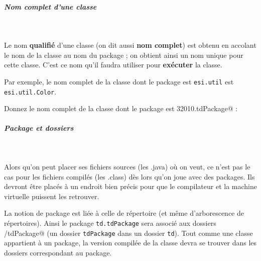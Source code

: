 \documentclass[11pt,a4paper]{article}
\begin{document}
		\subparagraph{Nom complet d'une classe} 
		
					\textcolor{white}{.} \par
				
            \par
        
				Le nom 
				\textbf{qualifi\'e} 
				d'une classe 
				(on dit aussi \textbf{nom complet})
				est obtenu en accolant
				le nom de la classe au nom du package ;
				on obtient ainsi un nom unique pour cette classe.
				C'est ce nom qu'il faudra utiliser pour 
				\textbf{ex\'ecuter} la classe.
			
            \par
        
				Par exemple, le nom complet de la classe \verb@Color@ 
				dont le package est \verb|esi.util|
				est \verb|esi.util.Color|. 
			
            \par
        
						Donnez le nom complet de la classe \verb@SurfaceTriangle@
						dont le package est \verb@g32010.tdPackage@ :
					 \textcolor{gray}{\underline{\hspace*{20em}}} 
			
		\subparagraph{Package et dossiers} 
		
					\textcolor{white}{.} \par
				
            \par
        
				Alors qu'on peut placer ses fichiers sources (les .java)
				o\`u on veut, ce n'est pas le cas pour les fichiers
				compil\'es (les .class) d\`es lors qu'on joue avec des packages.
				Ils devront \^etre plac\'es \`a un endroit bien pr\'ecis
				pour que le compilateur et la machine virtuelle
				puissent les retrouver.
			
            \par
        			
				La notion de package est li\'ee \`a celle de r\'epertoire
				(et m\^eme d'arborescence de r\'epertoires).
				Ainsi le package
				\verb|td.tdPackage| sera associ\'e 
				aux dossiers \verb@td/tdPackage@
				(un dossier \verb|tdPackage| 
				dans un dossier \verb|td|).
				Tout comme une classe appartient \`a un package,
				la version compil\'ee de la classe
				devra se trouver dans les dossiers correspondant au package.
			
            \par
        
\end{document}
